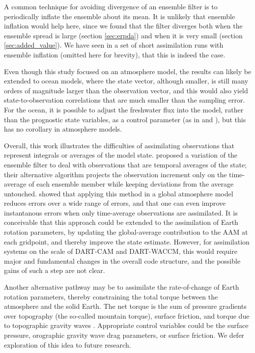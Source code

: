 A common technique for avoiding divergence of an ensemble filter is to periodically inflate the ensemble about its mean. 
It is unlikely that ensemble inflation would help here, since we found that the filter diverges both when the ensemble spread is large (section \ref{sec:erpda}) and when it is very small (section \ref{sec:added_value}). 
We have seen in a set of short assimilation runs with ensemble inflation (omitted here for brevity), that this is indeed the case. 


Even though this study focused on an atmosphere model, the results can likely be extended to ocean models, where the state vector, although smaller, is still many orders of magnitude larger than the observation vector, and this would also yield state-to-observation correlations that are much smaller than the sampling error. 
For the ocean, it is possible to adjust the freshwater flux into the model, rather than the prognostic state variables, as a control parameter (as in \citet{Saynisch2010} and \citet{Saynisch2012}), but this has no corollary in atmosphere models. 


Overall, this work illustrates the difficulties of assimilating observations that represent integrals or averages of the model state. 
\citet{Dirren2005} proposed a variation of the ensemble filter to deal with observations that are temporal averages of the state; their alternative algorithm projects the observation increment only on the time-average of each ensemble member while keeping deviations from the average untouched. 
\citet{Huntley2009} showed that applying this method in a global atmosphere model reduces errors over a wide range of errors, and that one can even improve instantanous errors when only time-average observations are assimilated. 
It is conceivable that this approach could be extended to the assimilation of Earth rotation parameters, by updating the global-average contribution to the AAM at each gridpoint, and thereby improve the state estimate. 
However, for assimilation systems on the scale of DART-CAM and DART-WACCM, this would require major and fundamental changes in the overall code structure, and the possible gains of such a step are not clear. 


Another alternative pathway may be to assimilate the rate-of-change of Earth rotation parameters, thereby constraining the total torque between the atmosphere and the solid Earth. 
The net torque is the sum of pressure gradients over topography (the so-called mountain torque), surface friction, and torque due to topographic gravity waves \citep{Lejenas1997}. 
Appropriate control variables could be the surface pressure, orographic gravity wave drag parameters, or surface friction. 
We defer exploration of this idea to future research. 


